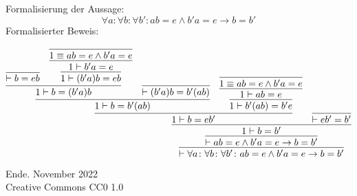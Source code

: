 \documentclass[8pt]{beamer}
\newcommand{\modest}[1]{{\small\color{gray}#1}}
\newcommand{\cond}{\rightarrow}
\begin{document}
\begin{frame}
Formalisierung der Aussage:
\[\forall a\colon\forall b\colon\forall b'\colon ab=e\land b'a=e\cond b=b'\]\pause
Formalisierter Beweis:

\begin{small}
\[
\infer{\vdash\forall a\colon\forall b\colon\forall b'\colon ab=e\land b'a=e\cond b=b'}{
  \infer{\vdash ab=e\land b'a=e\cond b=b'}{
    \infer{1\vdash b=b'}{
      \infer{1\vdash b=eb'}{
        \infer{1\vdash b=b'(ab)}{
          \infer{1\vdash b=(b'a)b}{
            \infer{\vdash b=eb}{}
          & \infer{1\vdash (b'a)b=eb}{
              \infer{1\vdash b'a=e}{
                \infer{1\equiv ab=e\land b'a=e}{}}}
          }
        & \infer{\vdash (b'a)b = b'(ab)}{}
        }
      & \infer{1\vdash b'(ab)=b'e}{
            \infer{1\vdash ab=e}{
              \infer{1\equiv ab=e\land b'a=e}{}}}
      }
    & \infer{\vdash eb'=b'}{}}}}
\]
\end{small}
\end{frame}

\begin{frame}
Ende.
\vfill\hfill\modest{November 2022}\\
\hfill\modest{Creative Commons CC0 1.0}
\end{frame}
\end{document}

